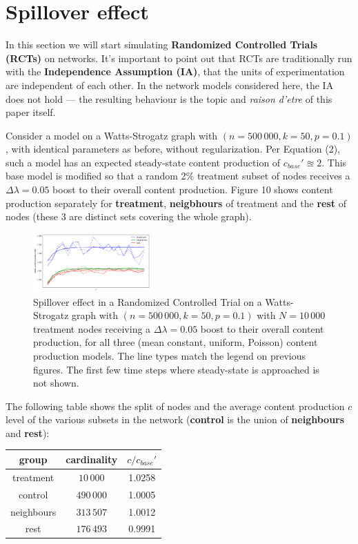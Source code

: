 \documentclass[final,5p,times,twocolumn,authoryear]{elsarticle}
\begin{document}
\section{Spillover effect}

In this section we will start simulating \textbf{Randomized Controlled Trials (RCTs)} on networks. It's important to point out that RCTs are traditionally run with the \textbf{Independence Assumption (IA)}, that the units of experimentation are independent of each other. In the network models considered here, the IA does not hold --- the resulting behaviour is the topic and \textit{raison d'etre} of this paper itself.

Consider a model on a Watts-Strogatz graph with $(n=500\,000, k=50, p=0.1)$, with identical parameters as before, without regularization. Per Equation (2), such a model has an expected steady-state content production of $c_{base}\prime \approxeq 2$. This base model is modified so that a random 2\% treatment subset of nodes receives a $\Delta \lambda = 0.05$ boost to their overall content production. Figure 10 shows content production separately for \textbf{treatment}, \textbf{neigbhours} of treatment and the \textbf{rest} of nodes (these 3 are distinct sets covering the whole graph).

\begin{figure}[h]
	\centering 
	\includegraphics[width=0.4\textwidth]{figure-10.png}	
	\caption{Spillover effect in a Randomized Controlled Trial on a Watts-Strogatz graph with $(n=500\,000, k=50, p=0.1)$ with $N=10\,000$ treatment nodes receiving a $\Delta \lambda = 0.05$ boost to their overall content production, for all three (mean constant, uniform, Poisson) content production models. The line types match the legend on previous figures. The first few time steps where steady-state is approached is not shown.} 
\end{figure}

The following table shows the split of nodes and the average content production $c$ level of the various subsets in the network (\textbf{control} is the union of \textbf{neighbours} and \textbf{rest}):

\begin{center}
\begin{tabular}{ |c|c|c| } 
 \hline
 \textbf{group} & \textbf{cardinality} & $c / c_{base}\prime$ \\ 
 \hline
 treatment   &   $10\,000$   &  1.0258 \\ 
 control     &  $490\,000$   &  1.0005 \\ 
 neighbours  &  $313\,507$   &  1.0012 \\ 
 rest        &  $176\,493$   &  0.9991 \\ 
 \hline
\end{tabular}
\end{center}
\end{document}
